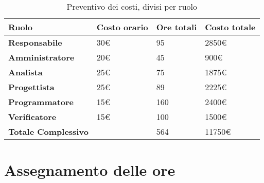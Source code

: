 \documentclass[a4paper, 12pt]{article}
\begin{document}
\begin{table}[H]
	\renewcommand{\arraystretch}{1.5}
	\centering
	\begin{tabular}{l|l|l|l}
		\textbf{Ruolo}              & \textbf{Costo orario} & \textbf{Ore totali} & \textbf{Costo totale} \\ \hline
		\toprule
		\textbf{Responsabile}       & 30€                   & 95                  & 2850€                 \\
		\textbf{Amministratore}     & 20€                   & 45                  & 900€                  \\
		\textbf{Analista}           & 25€                   & 75                  & 1875€                 \\
		\textbf{Progettista}        & 25€                   & 89                  & 2225€                 \\
		\textbf{Programmatore}      & 15€                   & 160                 & 2400€                 \\
		\textbf{Verificatore}       & 15€                   & 100                 & 1500€                 \\
		\midrule
		\textbf{Totale Complessivo} &                       & 564                 & 11750€                \\
	\end{tabular}
	\caption{Preventivo dei costi, divisi per ruolo}

\end{table}

\section{Assegnamento delle ore}
\end{document}
